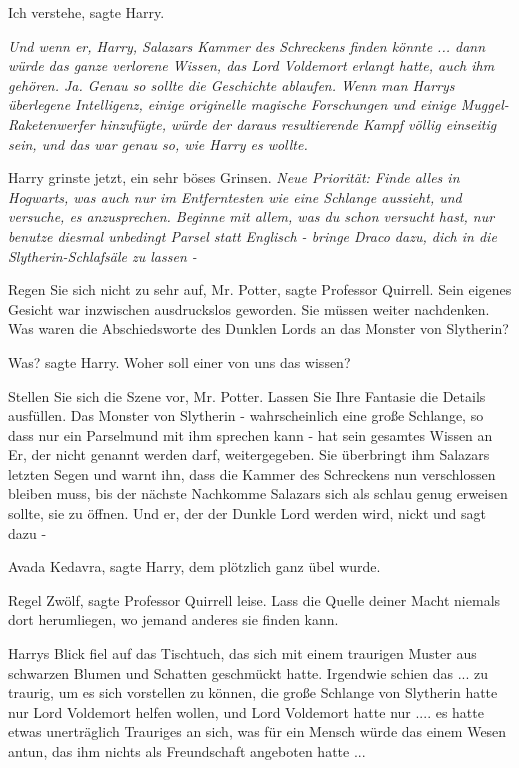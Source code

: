 \glqq{}Ich verstehe\grqq{}, sagte Harry.

\emph{Und wenn er, Harry, Salazars Kammer des Schreckens finden könnte ... dann
würde das ganze verlorene Wissen, das Lord Voldemort erlangt hatte, auch ihm
gehören. Ja. Genau so sollte die Geschichte ablaufen. Wenn man Harrys überlegene
Intelligenz, einige originelle magische Forschungen und einige
Muggel-Raketenwerfer hinzufügte, würde der daraus resultierende Kampf völlig
einseitig sein, und das war genau so, wie Harry es wollte.}

Harry grinste jetzt, ein sehr böses Grinsen.
\emph{Neue Priorität: Finde alles in Hogwarts, was auch nur im Entferntesten wie
eine Schlange aussieht, und versuche, es anzusprechen. Beginne mit allem, was
du schon versucht hast, nur benutze diesmal unbedingt Parsel statt Englisch -
bringe Draco dazu, dich in die Slytherin-Schlafsäle zu lassen -}

\glqq{}Regen Sie sich nicht zu sehr auf, Mr. Potter\grqq{}, sagte Professor
Quirrell. Sein eigenes Gesicht war inzwischen ausdruckslos geworden. \glqq{}Sie
müssen weiter nachdenken. Was waren die Abschiedsworte des Dunklen Lords an das
Monster von Slytherin?\grqq{}

\glqq{}Was?\grqq{} sagte Harry. \glqq{}Woher soll einer von uns das wissen?\grqq{}

\glqq{}Stellen Sie sich die Szene vor, Mr. Potter. Lassen Sie Ihre Fantasie die
Details ausfüllen. Das Monster von Slytherin - wahrscheinlich eine große
Schlange, so dass nur ein Parselmund mit ihm sprechen kann - hat sein gesamtes
Wissen an Er, der nicht genannt werden darf, weitergegeben. Sie überbringt ihm
Salazars letzten Segen und warnt ihn, dass die Kammer des Schreckens nun
verschlossen bleiben muss, bis der nächste Nachkomme Salazars sich als schlau
genug erweisen sollte, sie zu öffnen. Und er, der der Dunkle Lord werden wird,
nickt und sagt dazu -\grqq{}

\glqq{}Avada Kedavra\grqq{}, sagte Harry, dem plötzlich ganz übel wurde.

\glqq{}Regel Zwölf\grqq{}, sagte Professor Quirrell leise. \glqq{}Lass die Quelle
deiner Macht niemals dort herumliegen, wo jemand anderes sie finden kann.\grqq{}

Harrys Blick fiel auf das Tischtuch, das sich mit einem traurigen Muster aus
schwarzen Blumen und Schatten geschmückt hatte. Irgendwie schien das ... zu
traurig, um es sich vorstellen zu können, die große Schlange von Slytherin hatte
nur Lord Voldemort helfen wollen, und Lord Voldemort hatte nur .... es hatte
etwas unerträglich Trauriges an sich, was für ein Mensch würde das einem Wesen
antun, das ihm nichts als Freundschaft angeboten hatte ...

